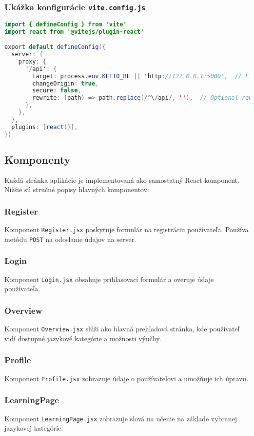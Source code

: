 \documentclass{article}
\begin{document}
\subsubsection{Ukážka konfigurácie \texttt{vite.config.js}}
\begin{lstlisting}[language=java, caption={Konfigurácia prostredia pomocou Vite}]
import { defineConfig } from 'vite'
import react from '@vitejs/plugin-react'

export default defineConfig({
  server: {
    proxy: {
      '/api': {
        target: process.env.KETTO_BE || 'http://127.0.0.1:5000',  // Flask backend server
        changeOrigin: true,
        secure: false,
        rewrite: (path) => path.replace(/^\/api/, ''),  // Optional rewrite rule
      },
    },
  },
  plugins: [react()],
})
\end{lstlisting}

\subsection{Komponenty}
Každá stránka aplikácie je implementovaná ako samostatný React komponent. Nižšie sú stručné popisy hlavných komponentov:

\subsubsection{Register}
Komponent \texttt{Register.jsx} poskytuje formulár na registráciu používateľa. Používa metódu \texttt{POST} na odoslanie údajov na server.

\subsubsection{Login}
Komponent \texttt{Login.jsx} obsahuje prihlasovací formulár a overuje údaje používateľa.

\subsubsection{Overview}
Komponent \texttt{Overview.jsx} slúži ako hlavná prehľadová stránka, kde používateľ vidí dostupné jazykové kategórie a možnosti výučby.

\subsubsection{Profile}
Komponent \texttt{Profile.jsx} zobrazuje údaje o používateľovi a umožňuje ich úpravu.

\subsubsection{LearningPage}
Komponent \texttt{LearningPage.jsx} zobrazuje slová na učenie na základe vybranej jazykovej kategórie.
\end{document}
